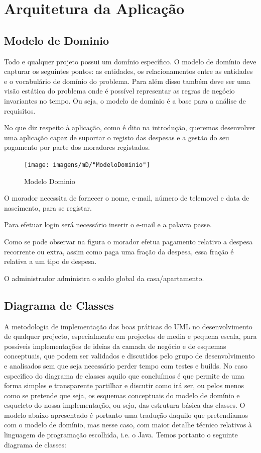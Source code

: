 \chapter{Arquitetura da Aplicação}

\section{Modelo de Dominio }
Todo e qualquer projeto possui um domínio específico. O modelo de domínio deve capturar os seguintes pontos: as entidades, os relacionamentos entre as entidades e o vocabulário de domínio do problema. Para além disso também deve ser uma visão estática do problema onde é possível representar as regras de negócio invariantes no tempo. Ou seja, o modelo de domínio é a base para a análise de requisitos.

No que diz respeito à aplicação, como é dito na introdução, queremos desenvolver uma aplicação capaz de suportar o registo das despesas e a gestão do seu pagamento por parte dos moradores registados.


\begin{figure}[htb!]
	\texttt{[image: imagens/mD/"ModeloDominio"]}  
	\caption{Modelo Dominio}  
\end{figure}

O morador necessita de fornecer o nome, e-mail, número de telemovel e data de nascimento, para se registar. 

Para efetuar login será necessário inserir o e-mail e a palavra passe. 

Como se pode observar na figura o morador efetua pagamento relativo a despesa recorrente ou extra, assim como paga uma fração da despesa, essa fração é relativa a um tipo de despesa. 


O administrador administra o saldo global da casa/apartamento. 


\newpage

\section{Diagrama de Classes}
A metodologia de implementação das boas práticas do UML no desenvolvimento de qualquer
projecto, especialmente em projectos de media e pequena escala, para possíveis implementações de ideias da camada de negócio e de esquemas conceptuais, que podem ser validados e discutidos pelo grupo de desenvolvimento e analisados sem que seja necessário perder tempo com testes e builds.
No caso especifico do diagrama de classes aquilo que concluímos é que permite de uma forma simples e transparente partilhar e discutir como irá ser, ou pelos menos como se pretende que seja, os esquemas
conceptuais do modelo de domínio e esqueleto do nossa implementação, ou seja, das estrutura básica das classes. O modelo abaixo apresentado é portanto uma tradução daquilo que pretendíamos com o
modelo de domínio, mas nesse caso, com maior detalhe técnico relativos à linguagem de programação escolhida, i.e. o Java. Temos portanto o seguinte diagrama de classes:

